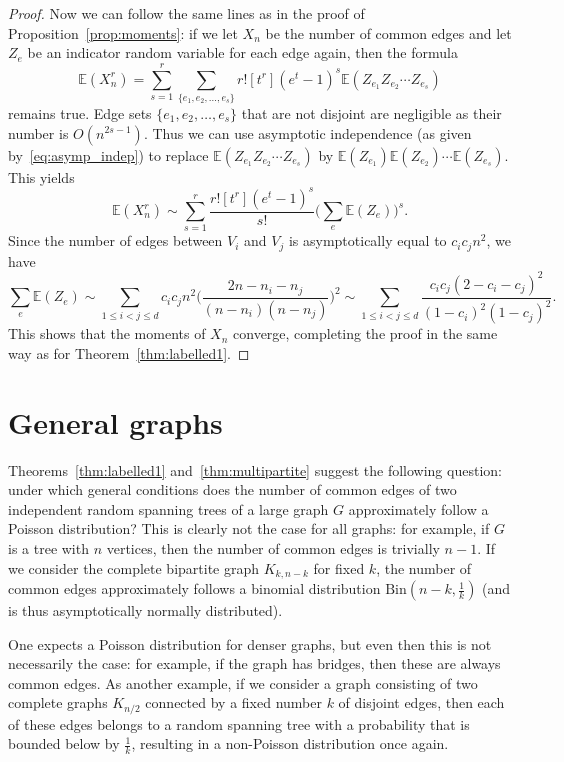 \documentclass[a4paper,12pt,reqno]{amsart}
\theoremstyle{remark}
\newcommand{\Ex}{\mathbb{E}}
\begin{document}
\begin{proof}
Now we can follow the same lines as in the proof of Proposition~\ref{prop:moments}: if we let $X_n$ be the number of common edges and let $Z_e$ be an indicator random variable for each edge again, then the formula
\[\Ex(X_n^r) = \sum_{s=1}^r \sum_{\{e_1,e_2,\ldots,e_s\}} r! [t^r] (e^t-1)^s \Ex(Z_{e_1}Z_{e_2}\cdots Z_{e_s})\]
remains true. Edge sets $\{e_1,e_2,\ldots,e_s\}$ that are not disjoint are negligible as their number is $O(n^{2s-1})$. Thus we can use asymptotic independence (as given by~\eqref{eq:asymp_indep}) to replace $\Ex(Z_{e_1}Z_{e_2}\cdots Z_{e_s})$ by $\Ex(Z_{e_1})\Ex(Z_{e_2})\cdots \Ex(Z_{e_s})$. This yields
\[\Ex(X_n^r) \sim \sum_{s=1}^r \frac{r! [t^r] (e^t-1)^s}{s!} \Big( \sum_e \Ex(Z_e) \Big)^s.\]
Since the number of edges between $V_i$ and $V_j$ is asymptotically equal to $c_i c_j n^2$, we have
\[\sum_e \Ex(Z_e) \sim \sum_{1 \leq i < j \leq d} c_i c_j n^2 \Big( \frac{2n-n_i-n_j}{(n-n_i)(n-n_j)} \Big)^2 \sim \sum_{1 \leq i < j \leq d} \frac{c_i c_j (2-c_i-c_j)^2}{(1-c_i)^2(1-c_j)^2}.\]
This shows that the moments of $X_n$ converge, completing the proof in the same way as for Theorem~\ref{thm:labelled1}.
\end{proof}

\section{General graphs}

Theorems~\ref{thm:labelled1} and~\ref{thm:multipartite} suggest the following question: under which general conditions does the number of common edges of two independent random spanning trees of a large graph $G$ approximately follow a Poisson distribution? This is clearly not the case for all graphs: for example, if $G$ is a tree with $n$ vertices, then the number of common edges is trivially $n-1$. If we consider the complete bipartite graph $K_{k,n-k}$ for fixed $k$, the number of common edges approximately follows a binomial distribution $\mathrm{Bin}(n-k,\frac1k)$ (and is thus asymptotically normally distributed).

One expects a Poisson distribution for denser graphs, but even then this is not necessarily the case: for example, if the graph has bridges, then these are always common edges. As another example, if we consider a graph consisting of two complete graphs $K_{n/2}$ connected by a fixed number $k$ of disjoint edges, then each of these edges belongs to a random spanning tree with a probability that is bounded below by $\frac1k$, resulting in a non-Poisson distribution once again.
\end{document}
